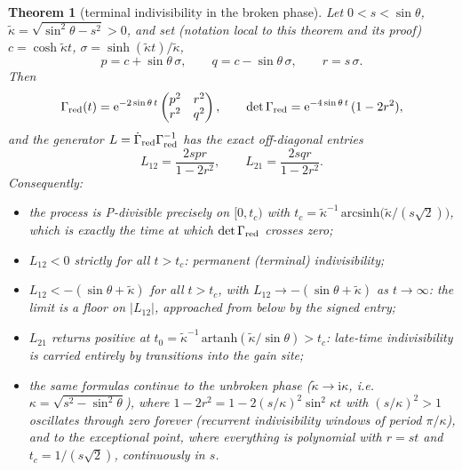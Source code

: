 \documentclass[11pt]{article}
\newtheorem{theorem}{Theorem}[section]
\theoremstyle{definition}
\theoremstyle{remark}
\newcommand{\ii}{\mathrm{i}}
\newcommand{\ee}{\mathrm{e}}
\newcommand{\Gam}{\Gamma}
\begin{document}
\begin{theorem}[terminal indivisibility in the broken phase]
\label{thm:terminal}
Let $0<s<\sin\theta$, $\tilde\kappa=\sqrt{\sin^{2}\theta-s^{2}}>0$, and set (notation local
to this theorem and its proof)
$c=\cosh\tilde\kappa t$, $\sigma=\sinh(\tilde\kappa t)/\tilde\kappa$,
\[
p=c+\sin\theta\,\sigma,\qquad
q=c-\sin\theta\,\sigma,\qquad
r=s\,\sigma .
\]
Then
\begin{equation}
\Gam_{\rm red}(t)=\ee^{-2\sin\theta\,t}
\begin{pmatrix} p^{2} & r^{2}\\ r^{2} & q^{2}\end{pmatrix},
\qquad
\det\Gam_{\rm red}=\ee^{-4\sin\theta\,t}\,(1-2r^{2}),
\label{eq:gredclosed}
\end{equation}
and the generator $L=\dot\Gam_{\rm red}\Gam_{\rm red}^{-1}$ has the exact
off-diagonal entries
\begin{equation}
L_{12}=\frac{2spr}{1-2r^{2}},
\qquad
L_{21}=\frac{2sqr}{1-2r^{2}} .
\label{eq:generator}
\end{equation}
Consequently:
\begin{itemize}
\item[(i)] the process is P-divisible precisely on $[0,t_c)$ with
$t_c=\tilde\kappa^{-1}\,\mathrm{arcsinh}\!\bigl(\tilde\kappa/(s\sqrt2)\bigr)$,
which is exactly the time at which $\det\Gam_{\rm red}$ crosses zero;
\item[(ii)] $L_{12}<0$ strictly for \emph{all} $t>t_c$: permanent
(terminal) indivisibility;
\item[(iii)] $L_{12}<-(\sin\theta+\tilde\kappa)$ for all $t>t_c$, with
$L_{12}\to-(\sin\theta+\tilde\kappa)$ as $t\to\infty$: the limit is a floor
on $|L_{12}|$, approached from below by the signed entry;
\item[(iv)] $L_{21}$ returns positive at
$t_0=\tilde\kappa^{-1}\,\mathrm{artanh}(\tilde\kappa/\sin\theta)>t_c$:
late-time indivisibility is carried entirely by transitions into the gain
site;
\item[(v)] the same formulas continue to the unbroken phase
($\tilde\kappa\to \ii\kappa$, i.e.\ $\kappa=\sqrt{s^{2}-\sin^{2}\theta}$), where
$1-2r^{2}=1-2(s/\kappa)^{2}\sin^{2}\kappa t$ with $(s/\kappa)^{2}>1$
oscillates through zero forever (recurrent indivisibility windows of
period $\pi/\kappa$), and to the exceptional point, where everything is
polynomial with $r=st$ and $t_c=1/(s\sqrt2)$, continuously in $s$.
\end{itemize}
\end{theorem}
\end{document}
